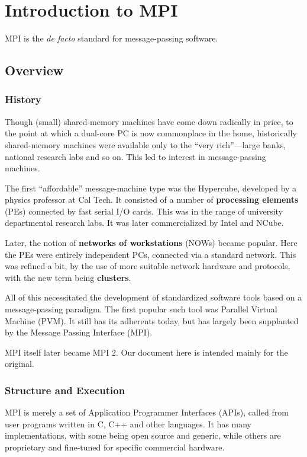 \chapter{Introduction to MPI} 
\label{chap:mpi}

MPI is the {\it de facto} standard for message-passing software.

\section{Overview}

\subsection{History}

Though (small) shared-memory machines have come down radically in price,
to the point at which a dual-core PC is now commonplace in the home,
historically shared-memory machines were available only to the ``very
rich''---large banks, national research labs and so on.  This led to
interest in message-passing machines.  

The first ``affordable'' message-machine type was the Hypercube,
developed by a physics professor at Cal Tech.  It consisted of a number
of {\bf processing elements} (PEs) connected by fast serial I/O cards.
This was in the range of university departmental research labs.  It was
later commercialized by Intel and NCube.

Later, the notion of {\bf networks of workstations} (NOWs) became
popular.  Here the PEs were entirely independent PCs, connected via a
standard network.  This was refined a bit, by the use of more suitable
network hardware and protocols, with the new term being {\bf clusters}.

All of this necessitated the development of standardized software tools
based on a message-passing paradigm.  The first popular such tool was
Parallel Virtual Machine (PVM).  It still has its adherents today, but
has largely been supplanted by the Message Passing Interface (MPI).

MPI itself later became MPI 2.  Our document here is intended mainly for
the original. 

\subsection{Structure and Execution}

MPI is merely a set of Application Programmer Interfaces (APIs), called
from user programs written in C, C++ and other languages.  It has many
implementations, with some being open source and generic, while others
are proprietary and fine-tuned for specific commercial hardware.

